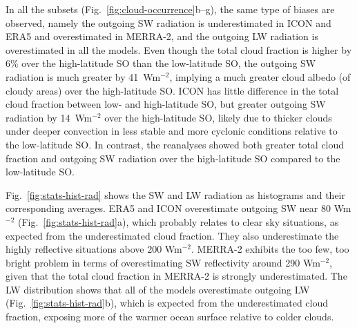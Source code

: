 \documentclass[draft]{agujournal2019}
\begin{document}
In all the subsets (Fig.~\ref{fig:cloud-occurrence}b--g), the same type of biases are observed, namely the outgoing SW radiation is underestimated in ICON and ERA5 and overestimated in MERRA-2, and the outgoing LW radiation is overestimated in all the models. Even though the total cloud fraction is higher by 6\% over the high-latitude SO than the low-latitude SO, the outgoing SW radiation is much greater by 41~Wm$^{-2}$, implying a much greater cloud albedo (of cloudy areas) over the high-latitude SO. ICON has little difference in the total cloud fraction between low- and high-latitude SO, but greater outgoing SW radiation by 14~Wm$^{-2}$ over the high-latitude SO, likely due to thicker clouds under deeper convection in less stable and more cyclonic conditions relative to the low-latitude SO. In contrast, the reanalyses showed both greater total cloud fraction and outgoing SW radiation over the high-latitude SO compared to the low-latitude SO.


Fig.~\ref{fig:stats-hist-rad} shows the SW and LW radiation as histograms and their corresponding averages. ERA5 and ICON overestimate outgoing SW near 80 Wm$^{-2}$ (Fig.~\ref{fig:stats-hist-rad}a), which probably relates to clear sky situations, as expected from the underestimated cloud fraction. They also underestimate the highly reflective situations above 200 Wm$^{-2}$. MERRA-2 exhibits the too few, too bright problem in terms of overestimating SW reflectivity around 290 Wm$^{-2}$, given that the total cloud fraction in MERRA-2 is strongly underestimated. The LW distribution shows that all of the models overestimate outgoing LW (Fig.~\ref{fig:stats-hist-rad}b), which is expected from the underestimated cloud fraction, exposing more of the warmer ocean surface relative to colder clouds.
\end{document}
